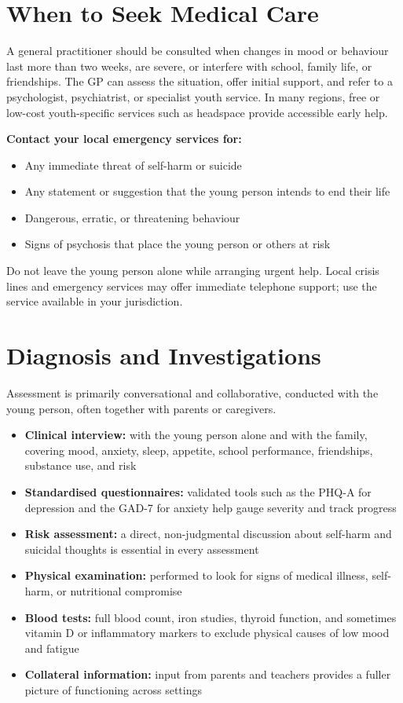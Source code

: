\section*{When to Seek Medical Care}
A general practitioner should be consulted when changes in mood or behaviour last more than two weeks, are severe, or interfere with school, family life, or friendships. The GP can assess the situation, offer initial support, and refer to a psychologist, psychiatrist, or specialist youth service. In many regions, free or low-cost youth-specific services such as headspace provide accessible early help.

\textbf{Contact your local emergency services for:}
\begin{itemize}
    \item Any immediate threat of self-harm or suicide
    \item Any statement or suggestion that the young person intends to end their life
    \item Dangerous, erratic, or threatening behaviour
    \item Signs of psychosis that place the young person or others at risk
\end{itemize}
Do not leave the young person alone while arranging urgent help. Local crisis lines and emergency services may offer immediate telephone support; use the service available in your jurisdiction.

\section*{Diagnosis and Investigations}
Assessment is primarily conversational and collaborative, conducted with the young person, often together with parents or caregivers.

\begin{itemize}
    \item \textbf{Clinical interview:} with the young person alone and with the family, covering mood, anxiety, sleep, appetite, school performance, friendships, substance use, and risk
    \item \textbf{Standardised questionnaires:} validated tools such as the PHQ-A for depression and the GAD-7 for anxiety help gauge severity and track progress
    \item \textbf{Risk assessment:} a direct, non-judgmental discussion about self-harm and suicidal thoughts is essential in every assessment
    \item \textbf{Physical examination:} performed to look for signs of medical illness, self-harm, or nutritional compromise
    \item \textbf{Blood tests:} full blood count, iron studies, thyroid function, and sometimes vitamin D or inflammatory markers to exclude physical causes of low mood and fatigue
    \item \textbf{Collateral information:} input from parents and teachers provides a fuller picture of functioning across settings
\end{itemize}

